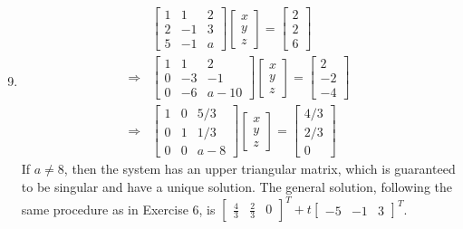 \documentclass[a4paper, 12pt]{article}
\begin{document}
\begin{enumerate}
		\setcounter{enumi}{8}
		\item
		\begin{align*}
		&\left[ \begin{array}{cccc}
		1 & 1 & 2 \\
		2 & -1 & 3 \\
		5 & -1 & a \end{array} \right]
		\left[ \begin{array}{c}
		x \\
		y \\
		z \end{array} \right]
		= \left[ \begin{array}{c}
		2 \\
		2 \\
		6 \end{array} \right] \\
		\Rightarrow &\left[ \begin{array}{cccc}
		1 & 1 & 2 \\
		0 & -3 & -1 \\
		0 & -6 & a - 10 \end{array} \right]
		\left[ \begin{array}{c}
		x \\
		y \\
		z \end{array} \right]
		= \left[ \begin{array}{c}
		2 \\
		-2 \\
		-4 \end{array} \right] \\
		\Rightarrow &\left[ \begin{array}{cccc}
		1 & 0 & 5/3 \\
		0 & 1 & 1/3 \\
		0 & 0 & a - 8 \end{array} \right]
		\left[ \begin{array}{c}
		x \\
		y \\
		z \end{array} \right]
		= \left[ \begin{array}{c}
		4/3 \\
		2/3 \\
		0 \end{array} \right]
		\end{align*}
		If $a \neq 8$, then the system has an upper triangular matrix, which is guaranteed to be singular and have a unique solution. The general solution, following the same procedure as in Exercise 6, is $\left[ \begin{array}{ccc} \frac{4}{3} & \frac{2}{3} & 0 \end{array} \right]^T + t\left[ \begin{array}{ccc} -5 & -1 & 3 \end{array} \right]^T$.
		

\end{enumerate}
\end{document}
